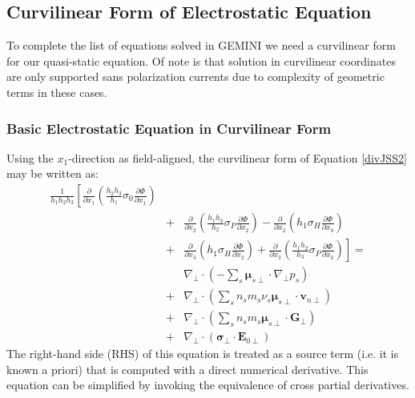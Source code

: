 \documentclass[11pt,letterpaper]{article}
\begin{document}
\subsection{Curvilinear Form of Electrostatic Equation}

To complete the list of equations solved in GEMINI we need a curvilinear form for our quasi-static equation.  Of note is that solution in curvilinear coordinates are only supported sans polarization currents due to complexity of geometric terms in these cases.  

\subsubsection{Basic Electrostatic Equation in Curvilinear Form}

Using the  $x_1$-direction as field-aligned, the curvilinear form of Equation \ref{divJSS2} may be written as:
\begin{eqnarray}
\frac{1}{h_1 h_2 h_3} \left[ \frac{\partial}{\partial x_1} \left( \frac{h_2 h_3}{h_1} \sigma_0 \frac{\partial \Phi}{\partial x_1} \right) \right. &~& \nonumber \\
 &+& \frac{\partial}{\partial x_2} \left( \frac{h_1 h_3}{h_2} \sigma_P \frac{\partial \Phi}{\partial x_2} \right) - \frac{\partial}{\partial x_2} \left( h_1 \sigma_H \frac{\partial \Phi}{\partial x_3} \right)  \nonumber \\ 
&+& \left. \frac{\partial}{\partial x_3} \left( h_1 \sigma_H \frac{\partial \Phi}{\partial x_2} \right) + \frac{\partial}{\partial x_3} \left( \frac{h_1 h_2}{h_3} \sigma_P \frac{\partial \Phi}{\partial x_3} \right) \right]  = \nonumber \\
& & \nabla_\perp \cdot \left(  - \sum_s \boldsymbol{\mu}_{s\perp} \cdot \nabla_\perp p_s \right) \nonumber \\
&+& \nabla_\perp \cdot \left(  \sum_s n_s m_s \nu_s \boldsymbol{\mu}_{s\perp} \cdot \mathbf{v}_{n\perp} \right) \nonumber \\
&+& \nabla_\perp \cdot \left(  \sum_s n_s m_s  \boldsymbol{\mu}_{s\perp} \cdot \mathbf{G}_\perp \right)  \nonumber \\
&+& \nabla_\perp \cdot \left( \boldsymbol{\sigma}_\perp \cdot \mathbf{E}_{0\perp} \right) 
\end{eqnarray}
The right-hand side (RHS) of this equation is treated as a source term (i.e. it is known a priori) that is computed with a direct numerical derivative.  This equation can be simplified by invoking the equivalence of cross partial derivatives.  
\end{document}
